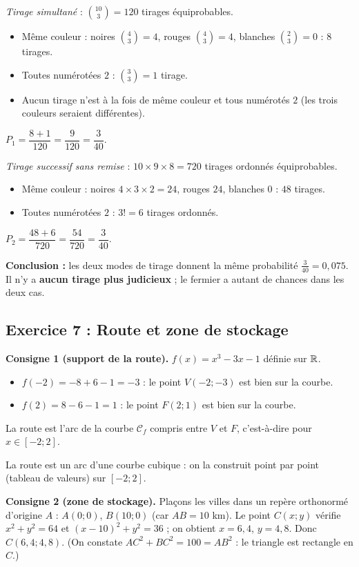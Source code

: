 \medskip\emph{Tirage simultan\'e} : $\binom{10}{3}=120$ tirages \'equiprobables.
\begin{itemize}
  \item M\^eme couleur : noires $\binom43=4$, rouges $\binom43=4$, blanches $\binom23=0$ : $8$ tirages.
  \item Toutes num\'erot\'ees $2$ : $\binom33=1$ tirage.
  \item Aucun tirage n'est \`a la fois de m\^eme couleur et tous num\'erot\'es $2$ (les trois couleurs seraient diff\'erentes).
\end{itemize}
$P_1=\dfrac{8+1}{120}=\dfrac{9}{120}=\dfrac{3}{40}$.

\medskip\emph{Tirage successif sans remise} : $10\times9\times8=720$ tirages ordonn\'es \'equiprobables.
\begin{itemize}
  \item M\^eme couleur : noires $4\times3\times2=24$, rouges $24$, blanches $0$ : $48$ tirages.
  \item Toutes num\'erot\'ees $2$ : $3!=6$ tirages ordonn\'es.
\end{itemize}
$P_2=\dfrac{48+6}{720}=\dfrac{54}{720}=\dfrac{3}{40}$.

\textbf{Conclusion :} les deux modes de tirage donnent la m\^eme probabilit\'e $\frac{3}{40}=0{,}075$. Il n'y a
\textbf{aucun tirage plus judicieux} ; le fermier a autant de chances dans les deux cas.

\subsection{Exercice 7 : Route et zone de stockage}

\textbf{Consigne 1 (support de la route).} $f(x)=x^3-3x-1$ d\'efinie sur $\mathbb{R}$.
\begin{itemize}
  \item $f(-2)=-8+6-1=-3$ : le point $V(-2;-3)$ est bien sur la courbe.
  \item $f(2)=8-6-1=1$ : le point $F(2;1)$ est bien sur la courbe.
\end{itemize}
La route est l'arc de la courbe $\mathcal C_f$ compris entre $V$ et $F$, c'est-\`a-dire pour $x\in[-2;2]$.
\begin{rem} La route est un arc d'une courbe cubique : on la construit point par point (tableau de valeurs) sur $[-2;2]$.\end{rem}

\medskip\noindent\textbf{Consigne 2 (zone de stockage).} Plaçons les villes dans un rep\`ere orthonormé d'origine $A$ :
$A(0;0)$, $B(10;0)$ (car $AB=10$ km). Le point $C(x;y)$ v\'erifie $x^2+y^2=64$ et $(x-10)^2+y^2=36$ ; on obtient $x=6{,}4$, $y=4{,}8$.
Donc $C(6{,}4;4{,}8)$. (On constate $AC^2+BC^2=100=AB^2$ : le triangle est rectangle en $C$.)


